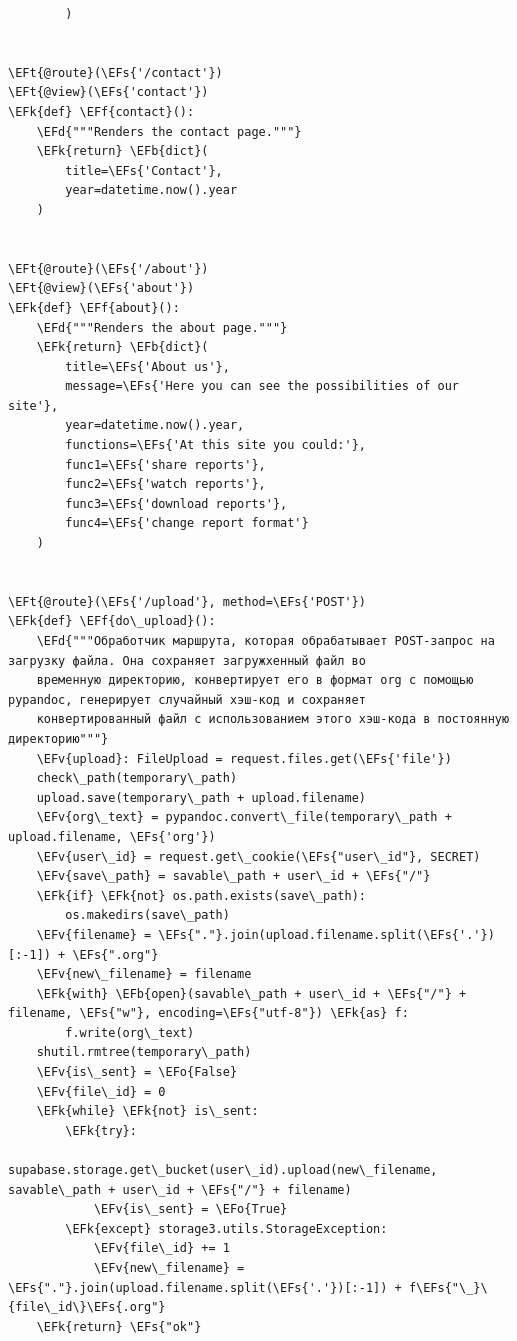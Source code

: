 \documentclass[14pt]{extarticle}
\newcommand{\EFs}[1]{\textcolor{EFs}{#1}} %
\newcommand{\EFd}[1]{\textcolor{EFd}{#1}} %
\newcommand{\EFk}[1]{\textcolor{EFk}{#1}} %
\newcommand{\EFb}[1]{\textcolor{EFb}{#1}} %
\newcommand{\EFf}[1]{\textcolor{EFf}{#1}} %
\newcommand{\EFv}[1]{\textcolor{EFv}{#1}} %
\newcommand{\EFt}[1]{\textcolor{EFt}{#1}} %
\newcommand{\EFo}[1]{\textcolor{EFo}{#1}} %
\begin{document}
\begin{Code}
\begin{Verbatim}
        )


\EFt{@route}(\EFs{'/contact'})
\EFt{@view}(\EFs{'contact'})
\EFk{def} \EFf{contact}():
    \EFd{"""Renders the contact page."""}
    \EFk{return} \EFb{dict}(
        title=\EFs{'Contact'},
        year=datetime.now().year
    )


\EFt{@route}(\EFs{'/about'})
\EFt{@view}(\EFs{'about'})
\EFk{def} \EFf{about}():
    \EFd{"""Renders the about page."""}
    \EFk{return} \EFb{dict}(
        title=\EFs{'About us'},
        message=\EFs{'Here you can see the possibilities of our site'},
        year=datetime.now().year,
        functions=\EFs{'At this site you could:'},
        func1=\EFs{'share reports'},
        func2=\EFs{'watch reports'},
        func3=\EFs{'download reports'},
        func4=\EFs{'change report format'}
    )


\EFt{@route}(\EFs{'/upload'}, method=\EFs{'POST'})
\EFk{def} \EFf{do\_upload}():
    \EFd{"""Обработчик маршрута, которая обрабатывает POST-запрос на загрузку файла. Она сохраняет загружxенный файл во
    временную директорию, конвертирует его в формат org с помощью pypandoc, генерирует случайный хэш-код и сохраняет
    конвертированный файл с использованием этого хэш-кода в постоянную директорию"""}
    \EFv{upload}: FileUpload = request.files.get(\EFs{'file'})
    check\_path(temporary\_path)
    upload.save(temporary\_path + upload.filename)
    \EFv{org\_text} = pypandoc.convert\_file(temporary\_path + upload.filename, \EFs{'org'})
    \EFv{user\_id} = request.get\_cookie(\EFs{"user\_id"}, SECRET)
    \EFv{save\_path} = savable\_path + user\_id + \EFs{"/"}
    \EFk{if} \EFk{not} os.path.exists(save\_path):
        os.makedirs(save\_path)
    \EFv{filename} = \EFs{"."}.join(upload.filename.split(\EFs{'.'})[:-1]) + \EFs{".org"}
    \EFv{new\_filename} = filename
    \EFk{with} \EFb{open}(savable\_path + user\_id + \EFs{"/"} + filename, \EFs{"w"}, encoding=\EFs{"utf-8"}) \EFk{as} f:
        f.write(org\_text)
    shutil.rmtree(temporary\_path)
    \EFv{is\_sent} = \EFo{False}
    \EFv{file\_id} = 0
    \EFk{while} \EFk{not} is\_sent:
        \EFk{try}:
            supabase.storage.get\_bucket(user\_id).upload(new\_filename, savable\_path + user\_id + \EFs{"/"} + filename)
            \EFv{is\_sent} = \EFo{True}
        \EFk{except} storage3.utils.StorageException:
            \EFv{file\_id} += 1
            \EFv{new\_filename} = \EFs{"."}.join(upload.filename.split(\EFs{'.'})[:-1]) + f\EFs{"\_}\{file\_id\}\EFs{.org"}
    \EFk{return} \EFs{"ok"}



\end{Verbatim}
\end{Code}
\end{document}
